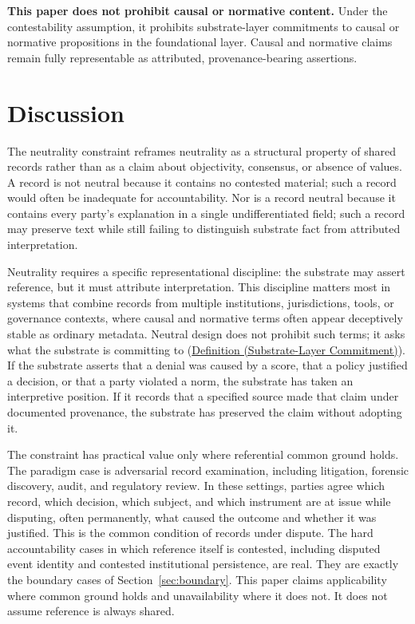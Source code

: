\documentclass[11pt]{article}
\theoremstyle{plain}
\theoremstyle{definition}
\theoremstyle{remark}
\newcommand{\DefRef}[2]{\hyperref[#1]{Definition (#2)}}
\newcommand{\SecRef}[1]{Section~\ref{#1}}
\begin{document}
\textbf{This paper does not prohibit causal or normative content.} Under
the contestability assumption, it prohibits substrate-layer commitments
to causal or normative propositions in the foundational layer.
Causal and normative claims remain fully representable as attributed,
provenance-bearing assertions.

\section{Discussion}
\label{sec:discussion}

The neutrality constraint reframes neutrality as a structural property of
shared records rather than as a claim about objectivity, consensus, or absence
of values.
A record is not neutral because it contains no contested material;
such a record would often be inadequate for accountability. Nor is a record
neutral because it contains every party's explanation in a single
undifferentiated field; such a record may preserve text while still failing to
distinguish substrate fact from attributed interpretation.

Neutrality requires a specific representational discipline:
the substrate may
assert reference, but it must attribute interpretation.
This discipline matters
most in systems that combine records from multiple institutions, jurisdictions,
tools, or governance contexts, where causal and normative terms often appear
deceptively stable as ordinary metadata.
Neutral design does not prohibit such terms;
it asks what the substrate is committing to
(\DefRef{se100.def.SubstrateCommitment}{Substrate-Layer Commitment}).
If the substrate asserts that a denial was caused by a score, that a policy justified
a decision, or that a party violated a norm, the substrate has taken an
interpretive position.
If it records that a specified source made that claim
under documented provenance, the substrate has preserved the claim without
adopting it.

The constraint has practical value only where referential common ground holds.
The paradigm case is adversarial record examination,
including litigation, forensic discovery, audit, and regulatory review.
In these settings, parties agree which record, which decision,
which subject, and which instrument are at issue while disputing,
often permanently, what caused the outcome and whether it was justified.
This is the common condition of records under dispute.
The hard accountability cases in which reference itself is contested,
including disputed event identity and contested institutional persistence, are real.
They are exactly the boundary cases of \SecRef{sec:boundary}.
This paper claims applicability where common ground holds and unavailability where it does not.
It does not assume reference is always shared.
\end{document}
